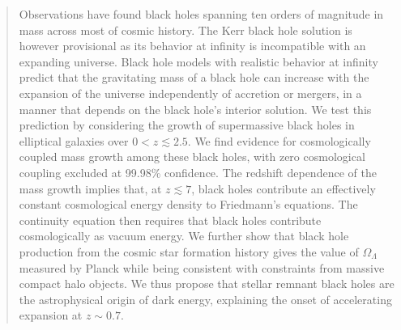 \documentclass[twocolumn,twocolappendix]{aastex631}
\begin{document}
\author[0000-0002-9548-5033]{David L Clements}

\author[0000-0002-2612-4840]{Andreas Efstathiou}

\author[0000-0003-0917-9636]{Evanthia Hatziminaoglou}

\author[0000-0002-3032-1783]{Mark Lacy}

\author[0000-0003-0639-025X]{Conor McPartland}

\author[0000-0002-5206-5880]{Lura K Pitchford}

\author[0000-0002-4702-0864]{Nobuyuki Sakai}

\author[0000-0002-1888-8744]{Joel Weiner}


\begin{abstract}
Observations have found black holes spanning ten orders of magnitude in mass across most of cosmic history.
The Kerr black hole solution is however provisional as its behavior at infinity is incompatible with an expanding universe.  
Black hole models with realistic behavior at infinity predict that the gravitating mass of a black hole can increase with the expansion of the universe independently of accretion or mergers, in a manner that depends on the black hole's interior solution.
We test this prediction by considering the growth of supermassive black holes in elliptical galaxies over $0<z\lesssim2.5$.
We find evidence for cosmologically coupled mass growth among these black holes, with zero cosmological coupling excluded at 99.98\% confidence.
The redshift dependence of the mass growth implies that, at $z\lesssim7$, black holes contribute an effectively constant cosmological energy density to Friedmann's equations.
The continuity equation then requires that black holes contribute cosmologically as vacuum energy.
We further show that black hole production from the cosmic star formation history gives the value of $\Omega_{\Lambda}$ measured by Planck while being consistent with constraints from massive compact halo objects.
We thus propose that stellar remnant black holes are the astrophysical origin of dark energy, explaining the onset of accelerating expansion at $z \sim 0.7$. 
\end{abstract}
\end{document}
